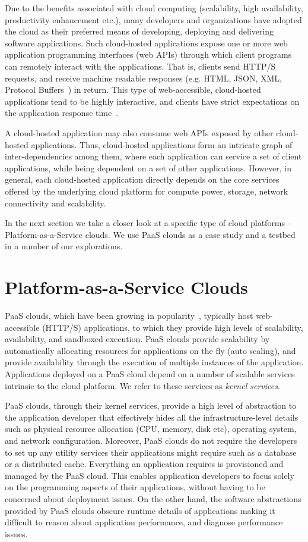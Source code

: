Due to the benefits associated with cloud computing (scalability, high availability, productivity enhancement etc.),
many developers and organizations have adopted the cloud as their preferred means of developing, deploying and
delivering software applications. Such cloud-hosted applications expose one or more web application programming 
interfaces (web APIs) through which client programs can remotely interact with the applications. That is, clients
send HTTP/S requests, and receive machine readable responses (e.g. HTML, JSON,
XML, Protocol Buffers~\cite{protobuff}) in return. This type of web-accessible, cloud-hosted applications
tend to be highly interactive, and clients have strict expectations on the application
response time~\cite{latency-matters}.

A cloud-hosted application may
also consume web APIs exposed by other cloud-hosted applications. Thus, cloud-hosted applications
form an intricate graph of inter-dependencies among them, where each application can service a set of client
applications, while being dependent on a set of other applications. However, in general, each cloud-hosted
application directly depends on the core services offered by the underlying cloud platform for compute power, storage,
network connectivity and scalability.

In the next section we take a closer look at a specific type of cloud platforms -- Platform-as-a-Service clouds.
We use PaaS clouds as a case study and a testbed in a number of our explorations.

\section{Platform-as-a-Service Clouds}

PaaS clouds, which have been growing in popularity~\cite{paas-growth,paas-growth2}, 
typically host web-accessible (HTTP/S) applications, to which they provide
high levels of scalability, availability, and sandboxed execution. PaaS clouds
provide scalability by automatically allocating resources for
applications on the fly (auto scaling), and provide availability through the
execution of multiple instances of the application. Applications deployed on
a PaaS cloud depend on a number of scalable services intrinsic to the 
cloud platform. We refer to these services as \textit{kernel services}.

PaaS clouds, through their kernel services, provide a high level of
abstraction to the application developer that effectively hides all the
infra\-structure-level details such as physical resource allocation (CPU,
memory, disk etc), operating system, and network configuration. 
Moreover, PaaS clouds do not require the developers
to set up any utility services their applications might require such as a 
database or a distributed cache. 
Everything an application requires is provisioned and managed by the PaaS cloud.
This enables
application developers to focus solely on the programming aspects of their
applications, without having to be concerned about deployment issues. On
the other hand, the software abstractions provided by PaaS clouds obscure
runtime details of applications making it difficult to reason about application
performance, and diagnose performance issues.

